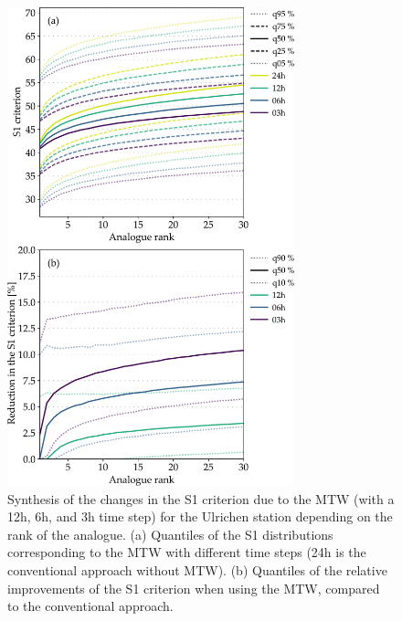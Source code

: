 \documentclass[hess, manuscript]{copernicus}
\begin{document}
	\begin{figure}[htb]
		\begin{center}
			\includegraphics[width=8.3cm]{fig04.pdf}
		\end{center}
		\caption{Synthesis of the changes in the S1 criterion due to the MTW (with a 12h, 6h, and 3h time step) for the Ulrichen station depending on the rank of the analogue. (a) Quantiles of the S1 distributions corresponding to the MTW with different time steps (24h is the conventional approach without MTW). (b) Quantiles of the relative improvements of the S1 criterion when using the MTW, compared to the conventional approach.}
		\label{fig:changes_S1}
	\end{figure}
	
\end{document}
